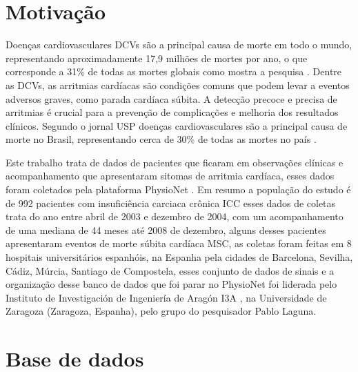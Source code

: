 \section{Motivação}\label{sec:Motivacao}

Doenças cardiovasculares \gls{DCVs} são a principal causa de morte em todo o mundo, representando aproximadamente 17,9 milhões de mortes por ano, o que corresponde a 31\% de todas as mortes globais como mostra a pesquisa \cite{who2021cardiovascular}. Dentre as DCVs, as arritmias cardíacas são condições comuns que podem levar a eventos adversos graves, como parada cardíaca súbita. A detecção precoce e precisa de arritmias é crucial para a prevenção de complicações e melhoria dos resultados clínicos. Segundo o jornal USP doenças cardiovasculares são a principal causa de morte no Brasil, representando cerca de 30\% de todas as mortes no país \cite{jornalusp2024doencas}.

Este trabalho trata de dados de pacientes que ficaram em observações clínicas e acompanhamento que apresentaram sitomas de arritmia cardíaca, esses dados foram coletados pela plataforma PhysioNet \cite{physionet2020music}. Em resumo a população do estudo é de 992 pacientes com insuficiência carciaca crônica \gls{ICC} esses dados de coletas trata do ano entre abril de 2003 e dezembro de 2004, com um acompanhamento de uma mediana de 44 meses até 2008 de dezembro, alguns desses
pacientes apresentaram eventos de morte súbita cardíaca \gls{MSC}, as coletas foram feitas em 8 hospitais universitários espanhóis, na Espanha pela cidades de Barcelona, Sevilha, Cádiz, Múrcia, Santiago de Compostela, esses conjunto de dados de sinais e a organização desse banco de dados que foi parar no PhysioNet foi liderada pelo Instituto de Investigación de Ingeniería de Aragón \gls{I3A} \cite{physionet2020music}, na Universidade de Zaragoza (Zaragoza, Espanha), pelo grupo do pesquisador Pablo Laguna.



\section{Base de dados}\label{sec:BaseDeDados}

